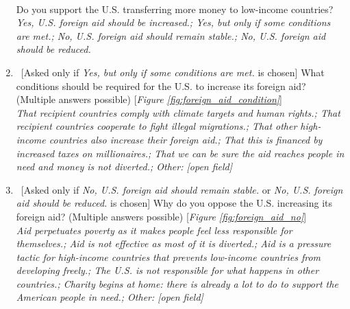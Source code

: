\begin{enumerate}[resume]
\\
Do you support the U.S. transferring more money to low-income countries?
\\ \textit{Yes, U.S. foreign aid should be increased.; Yes, but only if some conditions are met.; No, U.S. foreign aid should remain stable.; No, U.S. foreign aid should be reduced.}
\item ~[Asked only if \textit{Yes, but only if some conditions are met.} is chosen] \label{q:foreign_aid_condition} What conditions should be required for the U.S. to increase its foreign aid? (Multiple answers possible) [\textit{Figure \ref{fig:foreign_aid_condition}}]
\\ \textit{That recipient countries comply with climate targets and human rights.; That recipient countries cooperate to fight illegal migrations.; That other high-income countries also increase their foreign aid.; That this is financed by increased taxes on millionaires.; That we can be sure the aid reaches people in need and money is not diverted.; Other: [open field]}
\item ~[Asked only if \textit{No, U.S. foreign aid should remain stable.} or \textit{No, U.S. foreign aid should be reduced.} is chosen] \label{q:foreign_aid_no} Why do you oppose the U.S. increasing its foreign aid? (Multiple answers possible) [\textit{Figure \ref{fig:foreign_aid_no}}]
\\ \textit{Aid perpetuates poverty as it makes people feel less responsible for themselves.; Aid is not effective as most of it is diverted.; Aid is a pressure tactic for high-income countries that prevents low-income countries from developing freely.; The U.S. is not responsible for what happens in other countries.; Charity begins at home: there is already a lot to do to support the American people in need.; Other: [open field]}
\end{enumerate}

